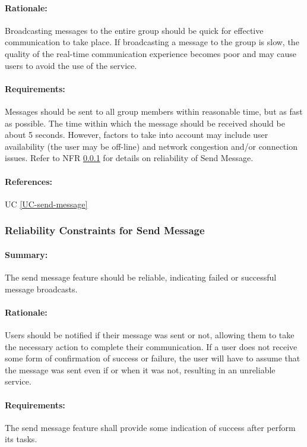 \documentclass[11pt]{article}
\begin{document}
\paragraph{Rationale:} Broadcasting messages to the entire group should be quick for effective communication to take place. If broadcasting a message to the group is slow, the quality of the real-time communication experience becomes poor and may cause users to avoid the use of the service. 
\paragraph{Requirements:} Messages should be sent to all group members within reasonable time, but as fast as possible. The time within which the message should be received should be about 5 seconds. However, factors to take into account may include user availability (the user may be off-line) and network congestion and/or connection issues. Refer to NFR \ref{NFR-reliability-send-message} for details on reliability of Send Message.
\paragraph{References:} UC \ref{UC-send-message}

\subsubsection{Reliability Constraints for Send Message} \label{NFR-reliability-send-message}
\paragraph{Summary:} The send message feature should be reliable, indicating failed or successful message broadcasts.
\paragraph{Rationale:} Users should be notified if their message was sent or not, allowing them to take the necessary action to complete their communication. If a user does not receive some form of confirmation of success or failure, the user will have to assume that the message was sent even if or when it was not, resulting in an unreliable service.
\paragraph{Requirements:} The send message feature shall provide some indication of success after perform its tasks.
\end{document}
